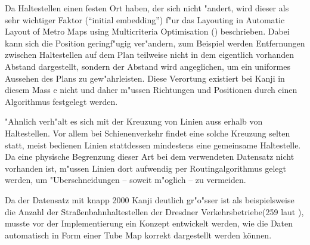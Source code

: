 Da Haltestellen einen festen Ort haben, der sich nicht "andert, wird dieser als sehr wichtiger Faktor ("`initial embedding"') f"ur das Layouting in Automatic Layout of Metro Maps using Multicriteria Optimisation (\cite{automaticlayoutmetro08}) beschrieben. Dabei kann sich die Position geringf"ugig ver"andern, zum Beispiel werden Entfernungen zwischen Haltestellen auf dem Plan teilweise nicht in dem eigentlich vorhanden Abstand dargestellt, sondern der Abstand wird angeglichen, um ein uniformes Aussehen des Plans zu gew"ahrleisten. Diese Verortung existiert bei Kanji in diesem Mass e nicht und daher m"ussen Richtungen und Positionen durch einen Algorithmus festgelegt werden. 

"Ahnlich verh"alt es sich mit der Kreuzung von Linien auss erhalb von Haltestellen. Vor allem bei Schienenverkehr findet eine solche Kreuzung selten statt, meist bedienen Linien stattdessen mindestens eine gemeinsame Haltestelle. Da eine physische Begrenzung dieser Art bei dem verwendeten Datensatz nicht vorhanden ist, m"ussen Linien dort aufwendig per Routingalgorithmus gelegt werden, um "Uberschneidungen – soweit m"oglich – zu vermeiden.

Da der Datensatz mit knapp 2000 Kanji deutlich gr"o"sser ist als beispielsweise die Anzahl der Straßenbahnhaltestellen der Dresdner Verkehrsbetriebe(259 laut \cite{dvbag}), musste vor der Implementierung ein Konzept entwickelt werden, wie die Daten automatisch in Form einer Tube Map korrekt dargestellt werden können.
